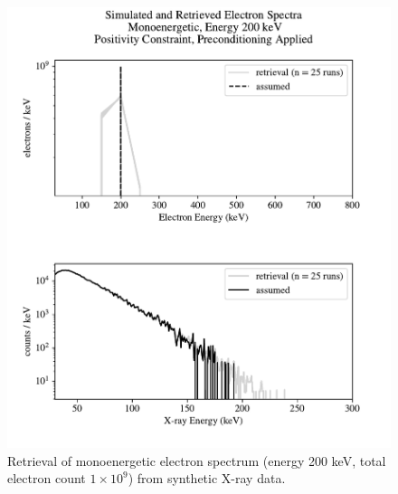 \begin{figure}[p]
    \centering
    \includegraphics[width=\textwidth]{figures/chapter_4/synthetic_data_examples/mono_200keV_posonly_preconditioning_1e9_particles}
    \caption{Retrieval of monoenergetic electron spectrum (energy 200 keV, total electron count $1\times10^9$) from synthetic X-ray data.}
    \label{why_non_negative_is_good}
\end{figure}

